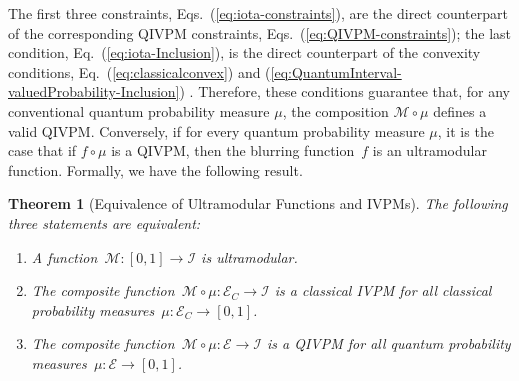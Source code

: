 \documentclass[english,reprint, aps, prl,superscriptaddress, showpacs,
showkeys, longbibliography, amsmath, amssymb, floatfix]{revtex4-1}
\theoremstyle{plain}
\newtheorem{thm}{Theorem}
\theoremstyle{definition}
\newcommand{\events}{\ensuremath{\mathcal{E}}}
\newcommand{\ultramodular}{\mathcal{M}}
\newcommand{\eventsC}{\ensuremath{\events_{C}}}
\begin{document}
\noindent The first three constraints,
Eqs.~(\ref{eq:iota-constraints}), are the direct counterpart of the
corresponding QIVPM constraints, Eqs.~(\ref{eq:QIVPM-constraints});
the last condition, Eq.~(\ref{eq:iota-Inclusion}), is the direct
counterpart of the convexity conditions,
Eq.~(\ref{eq:classicalconvex}) and
(\ref{eq:QuantumInterval-valuedProbability-Inclusion})
\cite{Choquet1954,Shapley1971,NgMoYeh1997,MarinacciMontrucchio2005}. Therefore,
these conditions guarantee that, for any conventional quantum
probability measure $\mu$, the composition $\ultramodular \circ \mu$
defines a valid QIVPM. Conversely, if for every quantum probability
measure $\mu$, it is the case that if $f \circ \mu$ is a QIVPM, then the blurring
function~$f$ is an ultramodular function. Formally, we have the following
result.

\begin{thm}[Equivalence of Ultramodular Functions and IVPMs]\label{thm:iota-statements}The
following three statements are equivalent:
\begin{enumerate}
\item \label{enu:iota-subject-to}A function~$\ultramodular:\left[0,1\right]\rightarrow\mathscr{I}$
is ultramodular.
\item \label{enu:iota-mu-CIVPM}The composite
  function~$\ultramodular\circ\mu:\eventsC\rightarrow\mathscr{I}$
  is a classical IVPM for all classical probability
  measures~$\mu:\eventsC\rightarrow\left[0,1\right]$.
\item \label{enu:iota-mu-QIVPM}The composite
  function~$\ultramodular\circ\mu:\events\rightarrow\mathscr{I}$ is a
  QIVPM for all quantum probability
  measures~$\mu:\events\rightarrow\left[0,1\right]$.
\end{enumerate}
\end{thm}
\end{document}
